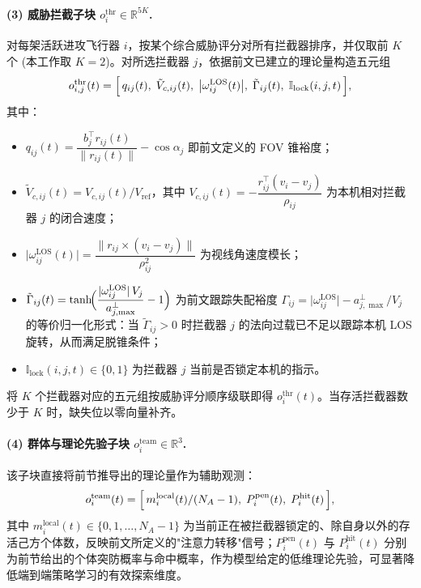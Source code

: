 \paragraph{(3) 威胁拦截子块 $o_i^{\mathrm{thr}}\in\mathbb{R}^{5K}$.}
对每架活跃进攻飞行器 $i$，按某个综合威胁评分对所有拦截器排序，并仅取前 $K$ 个 (本工作取 $K=2$)。对所选拦截器 $j$，依据前文已建立的理论量构造五元组
\begin{equation}
o_{i,j}^{\mathrm{thr}}(t)=
\Bigl[\,
q_{ij}(t),\;
\tilde V_{c,ij}(t),\;
\bigl|\omega_{ij}^{\mathrm{LOS}}(t)\bigr|,\;
\tilde\Gamma_{ij}(t),\;
\mathbb{I}_{\mathrm{lock}}(i,j,t)
\,\Bigr],
\label{eq:obs-thr}
\end{equation}
其中：
\begin{itemize}
  \item $q_{ij}(t)=\dfrac{b_j^{\top}r_{ij}(t)}{\|r_{ij}(t)\|}-\cos\alpha_j$ 即前文定义的 FOV 锥裕度；
  \item $\tilde V_{c,ij}(t)=V_{c,ij}(t)/V_{\mathrm{ref}}$，其中 $V_{c,ij}(t)=-\dfrac{r_{ij}^{\top}(v_i-v_j)}{\rho_{ij}}$ 为本机相对拦截器 $j$ 的闭合速度；
  \item $\bigl|\omega_{ij}^{\mathrm{LOS}}(t)\bigr|=\dfrac{\bigl\|r_{ij}\times(v_i-v_j)\bigr\|}{\rho_{ij}^{2}}$ 为视线角速度模长；
  \item $\tilde\Gamma_{ij}(t)=\tanh\!\Bigl(\dfrac{|\omega_{ij}^{\mathrm{LOS}}|\,V_j}{a_{j,\max}^{\perp}}-1\Bigr)$ 为前文跟踪失配裕度 $\Gamma_{ij}=\bigl|\omega_{ij}^{\mathrm{LOS}}\bigr|-a_{j,\max}^{\perp}/V_j$ 的等价归一化形式：当 $\tilde\Gamma_{ij}>0$ 时拦截器 $j$ 的法向过载已不足以跟踪本机 LOS 旋转，从而满足脱锥条件；
  \item $\mathbb{I}_{\mathrm{lock}}(i,j,t)\in\{0,1\}$ 为拦截器 $j$ 当前是否锁定本机的指示。
\end{itemize}
将 $K$ 个拦截器对应的五元组按威胁评分顺序级联即得 $o_i^{\mathrm{thr}}(t)$。当存活拦截器数少于 $K$ 时，缺失位以零向量补齐。

\paragraph{(4) 群体与理论先验子块 $o_i^{\mathrm{team}}\in\mathbb{R}^{3}$.}
该子块直接将前节推导出的理论量作为辅助观测：
\begin{equation}
o_i^{\mathrm{team}}(t)=\Bigl[\,m_i^{\mathrm{local}}(t)/(N_A-1),\;P_i^{\mathrm{pen}}(t),\;P_i^{\mathrm{hit}}(t)\,\Bigr],
\label{eq:obs-team}
\end{equation}
其中 $m_i^{\mathrm{local}}(t)\in\{0,1,\dots,N_A-1\}$ 为当前正在被拦截器锁定的、除自身以外的存活己方个体数，反映前文所定义的"注意力转移"信号；$P_i^{\mathrm{pen}}(t)$ 与 $P_i^{\mathrm{hit}}(t)$ 分别为前节给出的个体突防概率与命中概率，作为模型给定的低维理论先验，可显著降低端到端策略学习的有效探索维度。

